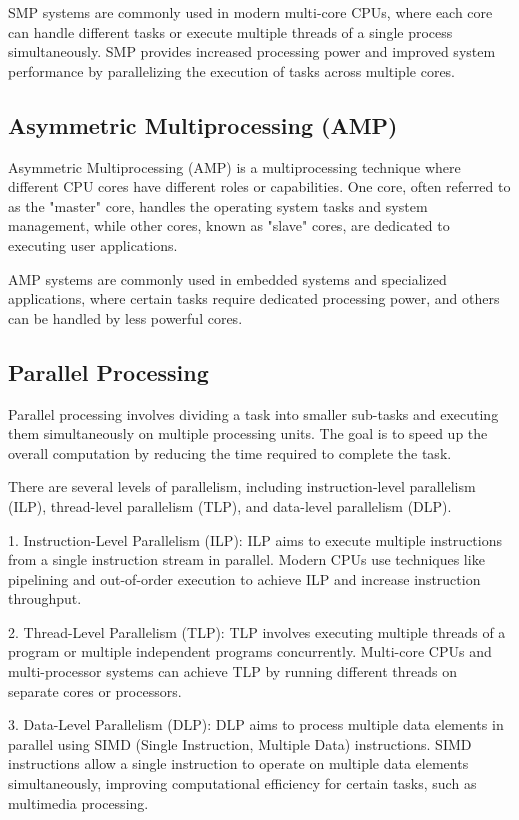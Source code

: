\documentclass{article}
\begin{document}
SMP systems are commonly used in modern multi-core CPUs, where each core can handle different tasks or execute multiple threads of a single process simultaneously. SMP provides increased processing power and improved system performance by parallelizing the execution of tasks across multiple cores.

\subsection{Asymmetric Multiprocessing (AMP)}

Asymmetric Multiprocessing (AMP) is a multiprocessing technique where different CPU cores have different roles or capabilities. One core, often referred to as the "master" core, handles the operating system tasks and system management, while other cores, known as "slave" cores, are dedicated to executing user applications.

AMP systems are commonly used in embedded systems and specialized applications, where certain tasks require dedicated processing power, and others can be handled by less powerful cores.

\subsection{Parallel Processing}

Parallel processing involves dividing a task into smaller sub-tasks and executing them simultaneously on multiple processing units. The goal is to speed up the overall computation by reducing the time required to complete the task.

There are several levels of parallelism, including instruction-level parallelism (ILP), thread-level parallelism (TLP), and data-level parallelism (DLP).

1. Instruction-Level Parallelism (ILP): ILP aims to execute multiple instructions from a single instruction stream in parallel. Modern CPUs use techniques like pipelining and out-of-order execution to achieve ILP and increase instruction throughput.

2. Thread-Level Parallelism (TLP): TLP involves executing multiple threads of a program or multiple independent programs concurrently. Multi-core CPUs and multi-processor systems can achieve TLP by running different threads on separate cores or processors.

3. Data-Level Parallelism (DLP): DLP aims to process multiple data elements in parallel using SIMD (Single Instruction, Multiple Data) instructions. SIMD instructions allow a single instruction to operate on multiple data elements simultaneously, improving computational efficiency for certain tasks, such as multimedia processing.
\end{document}
